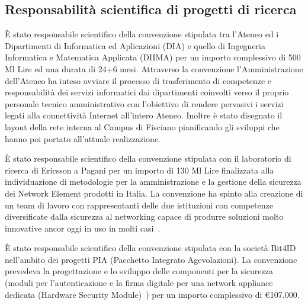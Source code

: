 \documentclass[11pt,a4paper,sans]{moderncv}        %
\begin{document}
\subsection{Responsabilità scientifica di progetti di ricerca} 


{
\`E stato responsabile scientifico della convenzione stipulata tra l'Ateneo ed i Dipartimenti di Informatica ed Aplicazioni (DIA) e quello di Ingegneria Informatica e Matematica Applicata (DIIMA) per un importo complessivo di 500 Ml Lire ed una durata di 24+6 mesi. Attraverso la convenzione l'Amministrazione dell'Ateneo ha inteso avviare il processo di trasferimento di competenze e responsabilità dei servizi informatici dai dipartimenti coinvolti verso il proprio personale tecnico amministrativo con l'obiettivo di rendere pervasivi i servizi legati alla connettività Internet all’intero Ateneo. Inoltre è stato disegnato il layout della rete interna al Campus di Fisciano pianificando gli sviluppi che hanno poi portato all'attuale realizzazione.
}


{
\`E stato responsabile scientifico della convenzione stipulata con il laboratorio di ricerca di Ericsson a Pagani per un importo di 130 Ml Lire finalizzata alla individuazione di metodologie per la amministrazione e la gestione della sicurezza dei Network Element prodotti in Italia. La convenzione ha spinto alla creazione di un team di lavoro con rappresentanti delle due istituzioni con competenze diversificate dalla sicurezza al networking capace di produrre soluzioni molto innovative ancor oggi in uso in molti casi~\cite{wbem:03, Cattaneo2003975}.
}


{
\`E stato responsabile scientifico della convenzione stipulata con la società Bit4ID nell'ambito dei progetti PIA (Pacchetto Integrato Agevolazioni). La convenzione prevedeva la progettazione e lo sviluppo delle componenti per la sicurezza (moduli per l’autenticazione e la firma digitale per una network appliance dedicata (Hardware Security Module)~\cite{Cattaneo200798, Cattaneo2010213, HSMProxyChap:2012}) per un importo complessivo di \euro{107.000}.
}
\end{document}

